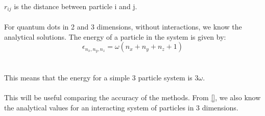 $r_{ij}$ is the distance between particle i and j. 
\\
\\
For quantum dots in 2 and 3 dimensions, without interactions, we know the analytical solutions. The energy of a particle in the system is given by:
\begin{equation}
    \epsilon_{n_x, n_y, n_z} = \omega(n_x + n_y + n_z + 1)
\end{equation}
\\
\\
This means that the energy for a simple 3 particle system is $3\omega$. 
\\
\\
This will be useful comparing the accuracy of the methods. From \ref{}, we also know the analytical values for an interacting system of particles in 3 dimensions.

\newpage
